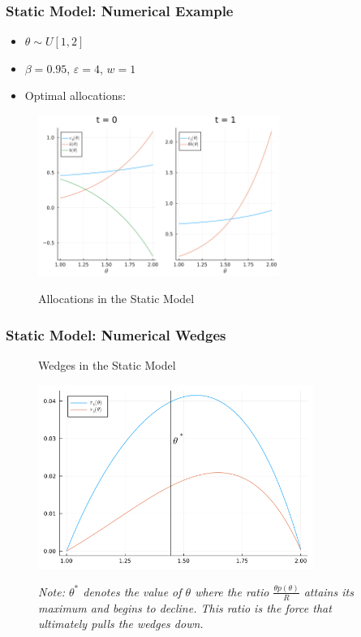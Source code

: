 \documentclass{beamer}
\begin{document}
\begin{frame}
    \frametitle{Static Model: Numerical Example}

    \begin{itemize}
        \item \( \theta \sim U[1,2] \)
        \item \( \beta = 0.95 \), \( \varepsilon = 4 \), \( w = 1 \)
        \item Optimal allocations: 
    \end{itemize}
    \begin{figure}[htbp]
        \centering
        \caption{Allocations in the Static Model}
        \includegraphics[width = 0.7\textwidth]{figures/allocations.png}
        \label{fig:static_allocs}
    \end{figure}

\end{frame}

\begin{frame}
    \frametitle{Static Model: Numerical Wedges}

    \begin{figure}[htbp]
        \centering
        \caption{Wedges in the Static Model}
        \includegraphics[width = 0.8\textwidth]{figures/wedges.png}
        \label{fig:static_wedges}
        \caption*{\textit{Note: \( \theta^* \) denotes the value of \( \theta \) where the ratio \( \frac{\theta p\left( \theta \right)}{R} \) attains its maximum and begins to decline. This ratio is the force that ultimately pulls the wedges down.}}
    \end{figure}
    
\end{frame}
\end{document}
